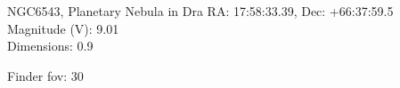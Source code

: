 \begin{block}{NGC6543, Planetary Nebula in Dra}
    RA: 17:58:33.39, Dec: +66:37:59.5 \\ 
    Magnitude (V): 9.01 \\ 
    Dimensions: 0.9 

    Finder fov: 30 
\end{block}